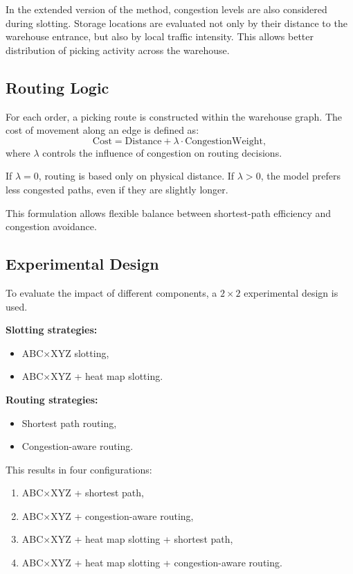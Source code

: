 \documentclass[12pt,a4paper]{article}
\begin{document}
In the extended version of the method, congestion levels are also considered during slotting.
Storage locations are evaluated not only by their distance to the warehouse entrance, but
also by local traffic intensity. This allows better distribution of picking activity across the
warehouse.

\subsection{Routing Logic}

For each order, a picking route is constructed within the warehouse graph. The cost of
movement along an edge is defined as:
\[
  \mathrm{Cost} = \mathrm{Distance} + \lambda \cdot \mathrm{CongestionWeight},
\]
where $\lambda$ controls the influence of congestion on routing decisions.

If $\lambda = 0$, routing is based only on physical distance. If $\lambda > 0$, the model
prefers less congested paths, even if they are slightly longer.

This formulation allows flexible balance between shortest-path efficiency and congestion
avoidance.

\subsection{Experimental Design}

To evaluate the impact of different components, a $2 \times 2$ experimental design is used.

\noindent\textbf{Slotting strategies:}
\begin{itemize}
  \item ABC$\times$XYZ slotting,
  \item ABC$\times$XYZ + heat map slotting.
\end{itemize}

\noindent\textbf{Routing strategies:}
\begin{itemize}
  \item Shortest path routing,
  \item Congestion-aware routing.
\end{itemize}

This results in four configurations:
\begin{enumerate}
  \item ABC$\times$XYZ + shortest path,
  \item ABC$\times$XYZ + congestion-aware routing,
  \item ABC$\times$XYZ + heat map slotting + shortest path,
  \item ABC$\times$XYZ + heat map slotting + congestion-aware routing.
\end{enumerate}
\end{document}
